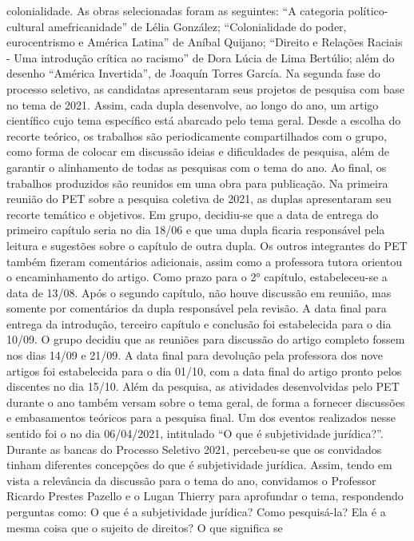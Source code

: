 colonialidade. As obras selecionadas foram as seguintes: “A categoria político-cultural
amefricanidade” de Lélia González; “Colonialidade do poder, eurocentrismo e América Latina”
de Aníbal Quijano; “Direito e Relações Raciais - Uma introdução crítica ao racismo” de Dora
Lúcia de Lima Bertúlio; além do desenho “América Invertida”, de Joaquín Torres García. Na
segunda fase do processo seletivo, as candidatas apresentaram seus projetos de pesquisa com
base no tema de 2021.
Assim, cada dupla desenvolve, ao longo do ano, um artigo científico cujo tema específico
está abarcado pelo tema geral. Desde a escolha do recorte teórico, os trabalhos são
periodicamente compartilhados com o grupo, como forma de colocar em discussão ideias e
dificuldades de pesquisa, além de garantir o alinhamento de todas as pesquisas com o tema do
ano. Ao final, os trabalhos produzidos são reunidos em uma obra para publicação.
Na primeira reunião do PET sobre a pesquisa coletiva de 2021, as duplas apresentaram
seu recorte temático e objetivos. Em grupo, decidiu-se que a data de entrega do primeiro capítulo
seria no dia 18/06 e que uma dupla ficaria responsável pela leitura e sugestões sobre o capítulo
de outra dupla. Os outros integrantes do PET também fizeram comentários adicionais, assim
como a professora tutora orientou o encaminhamento do artigo.
Como prazo para o 2° capítulo, estabeleceu-se a data de 13/08. Após o segundo capítulo,
não houve discussão em reunião, mas somente por comentários da dupla responsável pela
revisão. A data final para entrega da introdução, terceiro capítulo e conclusão foi estabelecida
para o dia 10/09. O grupo decidiu que as reuniões para discussão do artigo completo fossem nos
dias 14/09 e 21/09. A data final para devolução pela professora dos nove artigos foi estabelecida
para o dia 01/10, com a data final do artigo pronto pelos discentes no dia 15/10.
Além da pesquisa, as atividades desenvolvidas pelo PET durante o ano também versam
sobre o tema geral, de forma a fornecer discussões e embasamentos teóricos para a pesquisa
final. Um dos eventos realizados nesse sentido foi o no dia 06/04/2021, intitulado “O que é
subjetividade jurídica?”. Durante as bancas do Processo Seletivo 2021, percebeu-se que os
convidados tinham diferentes concepções do que é subjetividade jurídica. Assim, tendo em vista
a relevância da discussão para o tema do ano, convidamos o Professor Ricardo Prestes Pazello e
o Lugan Thierry para aprofundar o tema, respondendo perguntas como: O que é a subjetividade
jurídica? Como pesquisá-la? Ela é a mesma coisa que o sujeito de direitos? O que significa se
